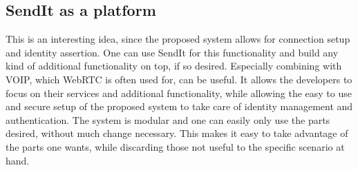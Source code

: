	\subsection{SendIt as a platform}
	This is an interesting idea, since the proposed system allows for connection setup and identity assertion. One can use SendIt for this functionality and build any kind of additional functionality on top, if so desired. Especially combining with VOIP, which WebRTC is often used for, can be useful. It allows the developers to focus on their services and additional functionality, while allowing the easy to use and secure setup of the proposed system to take care of identity management and authentication. The system is modular and one can easily only use the parts desired, without much change necessary. This makes it easy to take advantage of the parts one wants, while discarding those not useful to the specific scenario at hand. 
